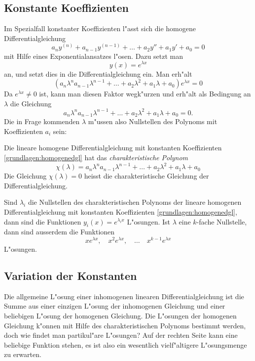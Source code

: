 \subsection{Konstante Koeffizienten}
Im Spezialfall konstanter Koeffizienten l"asst sich die homogene
Differentialgleichung
\begin{equation}
a_ny^{(n)}+a_{n-1}y^{(n-1)}+\dots+a_2y''+a_1y'+a_0=0
\label{grundlagen:homogenedgl}
\end{equation}
mit Hilfe eines Exponentialansatzes l"osen.
%
Dazu setzt man 
\[
y(x)=e^{\lambda x}
\]
an, und setzt dies in die Differentialgleichung ein.
Man erh"alt
\[
(a_n\lambda^n a_{n-1}\lambda^{n-1}+\dots+a_2\lambda^2+a_1\lambda+a_0)e^{\lambda x}=0
\]
Da $e^{\lambda x}\ne 0$ ist, kann man diesen Faktor wegk"urzen und erh"alt
als Bedingung an $\lambda$ die Gleichung
\[
a_n\lambda^n a_{n-1}\lambda^{n-1}+\dots+a_2\lambda^2+a_1\lambda+a_0=0.
\]
Die in Frage kommenden $\lambda$ m"ussen also Nullstellen des Polynoms
mit Koeffizienten $a_i$ sein:

\begin{definition}
Die lineare homogene Differentialgleichung mit konstanten Koeffizienten
\eqref{grundlagen:homogenedgl} hat das {\em charakteristische Polynom}
\begin{equation}
\chi(\lambda)
=
a_n\lambda^n a_{n-1}\lambda^{n-1}+\dots+a_2\lambda^2+a_1\lambda+a_0
\end{equation}
Die Gleichung $\chi(\lambda)=0$ heisst die charakteristische Gleichung
der Differentialgleichung.
\end{definition}
%
%
%
%

\begin{satz}
Sind $\lambda_i$ die Nullstellen des charakteristischen Polynoms der
lineare homogenen Differentialgleichung mit konstanten Koeffizienten
\eqref{grundlagen:homogenedgl}, dann sind die Funktionen
$y_i(x)=e^{\lambda_i x}$ L"osungen.
Ist $\lambda$ eine $k$-fache Nullstelle, dann sind ausserdem die
Funktionen
\[
xe^{\lambda x},\quad x^2e^{\lambda x},\quad\dots\quad x^{k-1}e^{\lambda x}
\]
L"osungen.
\end{satz}

%
%

\subsection{Variation der Konstanten}
Die allgemeine L"osung einer inhomogenen linearen Differentialgleichung ist die
Summe aus einer einzigen L"osung der inhomogenen Gleichung und einer
beliebigen L"osung der homogenen Gleichung.
Die L"osungen der homogenen Gleichung k"onnen mit Hilfe des charakteristischen
Polynoms bestimmt werden, doch wie findet man partikul"are L"osungen?
Auf der rechten Seite kann eine beliebige Funktion stehen, es ist also
ein wesentlich vielf"altigere L"osungsmenge zu erwarten.

